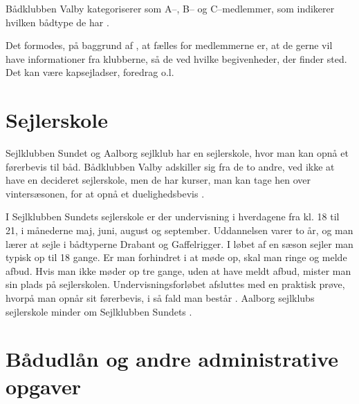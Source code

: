 Bådklubben Valby kategoriserer som A--, B-- og C--medlemmer, som indikerer hvilken bådtype de har
\citep{badklubben_valby_love}.

Det formodes, på baggrund af , at fælles for medlemmerne er, at de gerne vil have informationer fra klubberne, så de ved hvilke begivenheder, der finder sted. 
Det kan være kapsejladser, foredrag o.l.


\section{Sejlerskole}\label{sec:sejlerskole}

Sejlklubben Sundet og Aalborg sejlklub har en sejlerskole, hvor man kan opnå et førerbevis til båd. 
Bådklubben Valby adskiller sig fra de to andre, ved ikke at have en decideret sejlerskole, men de har kurser, man kan tage hen over vintersæsonen, for at opnå et duelighedsbevis \citep{baedklubben_valby_duelighedsbevis}.

I Sejlklubben Sundets sejlerskole er der undervisning i hverdagene fra kl. 18 til 21, i månederne maj, juni, august og september. 
Uddannelsen varer to år, og man lærer at sejle i bådtyperne Drabant og Gaffelrigger. 
I løbet af en sæson sejler man typisk op til 18 gange. 
Er man forhindret i at møde op, skal man ringe og melde afbud.
Hvis man ikke møder op tre gange, uden at have meldt afbud, mister man sin plads på sejlerskolen.
Undervisningsforløbet afsluttes med en praktisk prøve, hvorpå man opnår sit førerbevis, i så
fald man består \citep{Sundet}. 
Aalborg sejlklubs sejlerskole minder om Sejlklubben Sundets \citep{aalborg_sejlklub_sejlerskole}.


\section{Bådudlån og andre administrative opgaver}\label{subsec:bådudlån}

